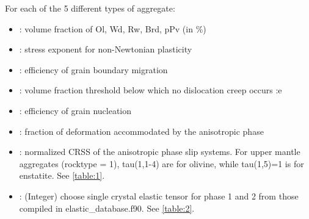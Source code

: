 \hspace{0.5cm} For each of the 5 different types of aggregate\footnotemark:
\vspace{0.5cm}


\begin{itemize}
    \item {}: volume fraction of Ol, Wd, Rw, Brd, pPv (in \%)
    \item {}: stress exponent for non-Newtonian plasticity  
    \item {}: efficiency of grain boundary migration 
    \item {}: volume fraction threshold below which no dislocation creep occurs   :e
    \item {}: efficiency of grain nucleation
    \item {}: fraction of deformation accommodated by the anisotropic phase
    \item {}: normalized CRSS of the anisotropic phase slip systems. For upper mantle aggregates (rocktype = 1), tau(1,1-4) are for olivine, while tau(1,5)=1 is for enstatite. See \ref{table:1}.
    \item {}: (Integer) choose single crystal elastic tensor for phase 1 and 2 from those compiled in elastic\_database.f90. See \ref{table:2}.
\end{itemize}

\vspace{1cm}

